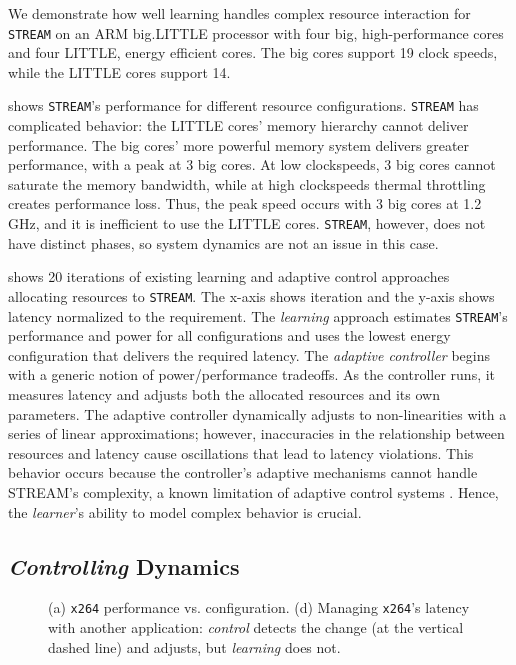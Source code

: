 We demonstrate how well learning handles complex resource interaction
for \texttt{STREAM} on an ARM big.LITTLE processor with four big,
high-performance cores and four LITTLE, energy efficient cores.  The
big cores support 19 clock speeds, while the LITTLE cores support 14.


 shows \texttt{STREAM}'s performance for
different resource configurations.  \texttt{STREAM} has complicated
behavior: the LITTLE cores' memory hierarchy cannot deliver
performance.  The big cores' more powerful memory system delivers
greater performance, with a peak at 3 big cores.  At low clockspeeds,
3 big cores cannot saturate the memory bandwidth, while at high
clockspeeds thermal throttling creates performance loss.  Thus, the
peak speed occurs with 3 big cores at 1.2 GHz, and it is inefficient
to use the LITTLE cores.  \texttt{STREAM}, however, does not have
distinct phases, so system dynamics are not an issue in this case.


 shows 20 iterations of existing learning
\cite{LEO} and adaptive control \cite{POET} approaches allocating
resources to \texttt{STREAM}.  The x-axis shows iteration and the
y-axis shows latency normalized to the requirement.  The
\emph{learning} approach estimates \texttt{STREAM}'s performance and
power for all configurations and uses the lowest energy configuration
that delivers the required latency.  The \emph{adaptive
  controller} begins with a generic notion of power/performance
tradeoffs.  As the controller runs, it measures latency and
adjusts both the allocated resources and its own parameters.  The
adaptive controller dynamically adjusts to non-linearities with a
series of linear approximations; however, inaccuracies in the
relationship between resources and latency cause oscillations that
lead to latency violations.  This behavior occurs because the
controller's adaptive mechanisms cannot handle STREAM's complexity, a
known limitation of adaptive control systems
\cite{ControlWare,POET,ICSE2014}.  Hence, the \emph{learner}'s ability
to model complex behavior is crucial.

\subsection{\emph{Controlling} Dynamics}
\label{sec:mov-control}

\begin{figure}
\centering
  \subfloat[]
  {
    
    \label{fig:X264_timeline}    
  }
  \caption{(a) \texttt{x264} performance vs. configuration. (d)
    Managing \texttt{x264}'s latency with another
    application: \emph{control} detects the change (at the vertical
    dashed line) and adjusts, but \emph{learning} does not.}
  \label{fig:control}
\end{figure}


